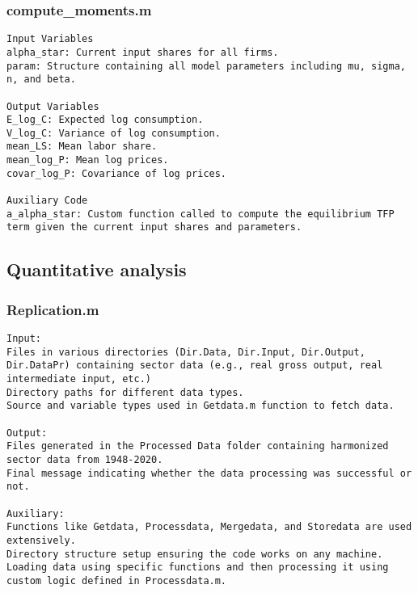 \documentclass[11pt]{article}
\theoremstyle{definition}
\newcommand{\codepath}{F:/12004835/replication_package_final/replication_package_final}
\begin{document}
	
	\subsubsection{compute\_moments.m}
	\begin{lstlisting}[style=Matlab]
Input Variables
alpha_star: Current input shares for all firms.
param: Structure containing all model parameters including mu, sigma, n, and beta.

Output Variables
E_log_C: Expected log consumption.
V_log_C: Variance of log consumption.
mean_LS: Mean labor share.
mean_log_P: Mean log prices.
covar_log_P: Covariance of log prices.

Auxiliary Code
a_alpha_star: Custom function called to compute the equilibrium TFP term given the current input shares and parameters.
	\end{lstlisting}
	
	
	\subsection{Quantitative analysis}
	\subsubsection{Replication.m}
	\begin{lstlisting}[style=Matlab]
Input:
Files in various directories (Dir.Data, Dir.Input, Dir.Output, Dir.DataPr) containing sector data (e.g., real gross output, real intermediate input, etc.)
Directory paths for different data types.
Source and variable types used in Getdata.m function to fetch data.

Output:
Files generated in the Processed Data folder containing harmonized sector data from 1948-2020.
Final message indicating whether the data processing was successful or not.

Auxiliary:
Functions like Getdata, Processdata, Mergedata, and Storedata are used extensively.
Directory structure setup ensuring the code works on any machine.
Loading data using specific functions and then processing it using custom logic defined in Processdata.m.
	\end{lstlisting}
	
	
\end{document}
